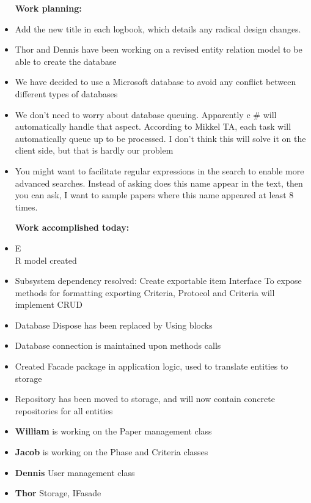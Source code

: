 \begin{itemize}
	\item [\textbf{Work planning:}]
	\item Add the new title in each logbook, which details any radical design changes.
	\item Thor and Dennis have been working on a revised entity relation model to be able to create the database
	\item We have decided to use a Microsoft database to avoid any conflict between different types of databases
	\item We don't need to worry about database queuing. Apparently c \# will automatically handle that aspect. According to Mikkel TA, each task will automatically queue up to be processed. I don't think this will solve it on the client side, but that is hardly our problem 
	\item You might want to facilitate regular expressions in the search  to enable more advanced searches. Instead of asking does this name appear in the text, then you can ask, I want to sample papers where this name appeared at least 8 times.
	
	\item [\textbf{Work accomplished today:}]
	\item E\\R model created 
	\item Subsystem dependency resolved: Create exportable item Interface To expose methods for formatting exporting Criteria, Protocol and Criteria will implement CRUD
	\item Database Dispose has been replaced by Using blocks 
	\item Database connection is maintained upon  methods calls
	\item Created Facade package in application logic, used to translate entities to storage 
	\item Repository has been moved to storage, and will now contain concrete repositories for all entities
	
	\item \textbf{William} is working on the Paper management class
	\item \textbf{Jacob} is working on the Phase and Criteria classes
	\item \textbf{Dennis} User management class
	\item \textbf{Thor} Storage, IFasade
\end{itemize}